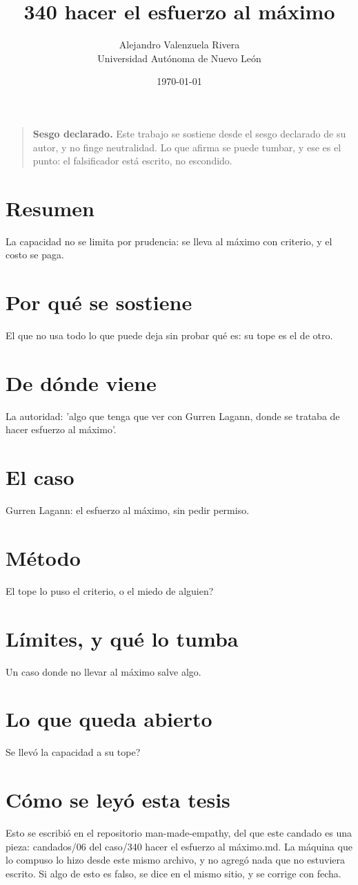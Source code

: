 \documentclass[11pt,a4paper]{article}
\title{340 hacer el esfuerzo al máximo}
\author{Alejandro Valenzuela Rivera\\\small Universidad Autónoma de Nuevo León}
\date{\today}
\begin{document}
\maketitle

\begin{quote}
\textbf{Sesgo declarado.} Este trabajo se sostiene desde el sesgo declarado de su autor, y no finge neutralidad. Lo que afirma se puede tumbar, y ese es el punto: el falsificador está escrito, no escondido.
\end{quote}

\section*{Resumen}
La capacidad no se limita por prudencia: se lleva al máximo con criterio, y el costo se paga.

\section{Por qué se sostiene}
El que no usa todo lo que puede deja sin probar qué es: su tope es el de otro.

\section{De dónde viene}
La autoridad: 'algo que tenga que ver con Gurren Lagann, donde se trataba de hacer esfuerzo al máximo'.

\section{El caso}
Gurren Lagann: el esfuerzo al máximo, sin pedir permiso.

\section{Método}
\textquestiondown{}El tope lo puso el criterio, o el miedo de alguien?

\section{Límites, y qué lo tumba}
Un caso donde no llevar al máximo salve algo.

\section{Lo que queda abierto}
\textquestiondown{}Se llevó la capacidad a su tope?

\section*{Cómo se leyó esta tesis}
Esto se escribió en el repositorio man-made-empathy, del que este candado es una pieza: candados/06 del caso/340 hacer el esfuerzo al máximo.md. La máquina que lo compuso lo hizo desde este mismo archivo, y no agregó nada que no estuviera escrito. Si algo de esto es falso, se dice en el mismo sitio, y se corrige con fecha.
\end{document}
